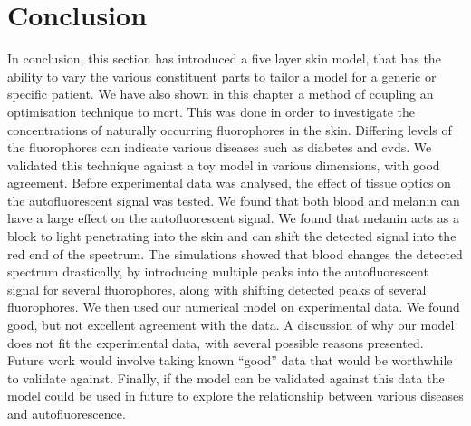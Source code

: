 \section{Conclusion}

In conclusion, this section has introduced a five layer skin model, that has the ability to vary the various constituent parts to tailor a model for a generic or specific patient.
We have also shown in this chapter a method of coupling an optimisation technique to \gls*{mcrt}.
This was done in order to investigate the concentrations of naturally occurring fluorophores in the skin.
Differing levels of the fluorophores can indicate various diseases such as diabetes and \gls*{cvds}.
We validated this technique against a toy model in various dimensions, with good agreement.
Before experimental data was analysed, the effect of tissue optics on the autofluorescent signal was tested.
We found that both blood and melanin can have a large effect on the autofluorescent signal.
We found that melanin acts as a block to light penetrating into the skin and can shift the detected signal into the red end of the spectrum.
The simulations showed that blood changes the detected spectrum drastically, by introducing multiple peaks into the autofluorescent signal for several fluorophores, along with shifting detected peaks of several fluorophores. 
We then used our numerical model on experimental data. We found good, but not excellent agreement with the data.
A discussion of why our model does not fit the experimental data, with several possible reasons presented.
Future work would involve taking known ``good'' data that would be worthwhile to validate against.
Finally, if the model can be validated against this data the model could be used in future to explore the relationship between various diseases and autofluorescence.


